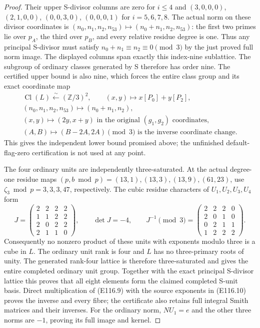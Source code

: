 \begin{proof}
Their upper S-divisor columns are zero for $i\le4$ and
$(3,0,0,0)$, $(2,1,0,0)$, $(0,0,3,0)$,
$(0,0,0,1)$ for $i=5,6,7,8$.
The actual norm on these divisor coordinates is
$(n_0,n_1,n_2,n_{53})\mapsto(n_0+n_1,n_2,n_{53})$:
the first two primes lie over $p_A$, the third over
$p_B$, and every relative residue degree is one.
Thus any principal S-divisor must satisfy
$n_0+n_1\equiv n_2\equiv0\pmod3$ by the just proved
full norm image. The displayed columns span exactly
this index-nine sublattice. The subgroup of ordinary
classes generated by S therefore has order nine.
The certified upper bound is also nine, which forces
the entire class group and its exact coordinate map
\[
 \begin{gathered}
 \operatorname{Cl}(L)\xleftarrow{\sim}(\mathbb Z/3)^2,
 \qquad (x,y)\longmapsto x[P_0]+y[P_2],\\
 (n_0,n_1,n_2,n_{53})\longmapsto(n_0+n_1,n_2),\\
 (x,y)\longmapsto(2y,x+y)
          \text{ in the original }(g_1,g_2)\text{ coordinates},\\
 (A,B)\longmapsto(B-2A,2A)\pmod3
          \text{ is the inverse coordinate change}.
 \end{gathered}
 \tag{E116.23}
\]
This gives the independent lower bound promised above;
the unfinished default-flag-zero certification is not
used at any point.

The four ordinary units are independently three-saturated.
At the actual degree-one residue maps
$(p,b\bmod p)=(13,1),(13,3),(13,9),(61,23)$,
use $\zeta_3\bmod p=3,3,3,47$, respectively.
The cubic residue characters of $U_1,U_2,U_3,U_4$ form
\[
 J=\begin{pmatrix}2&2&2&2\\1&1&2&2\\2&0&2&2\\2&1&1&0\end{pmatrix},
 \qquad\det J=-4,
 \qquad J^{-1}\pmod3=
 \begin{pmatrix}2&2&2&0\\2&0&1&0\\0&2&1&1\\1&2&2&2\end{pmatrix}.
 \tag{E116.24}
\]
Consequently no nonzero product of these units with
exponents modulo three is a cube in $L$.
The ordinary unit rank is four and $L$ has no
three-primary roots of unity. The generated rank-four
lattice is therefore three-saturated and gives the
entire completed ordinary unit group.
Together with the exact principal S-divisor lattice
this proves that all eight elements form the claimed
completed S-unit basis. Direct multiplication of
(E116.9) with the source exponents in (E116.10) proves
the inverse and every fibre; the certificate also
retains full integral Smith matrices and their inverses.
For the ordinary norm, $NU_1=e$ and the other three
norms are $-1$, proving its full image and kernel.


\end{proof}
